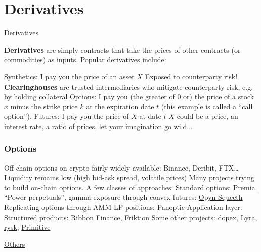 \documentclass[]{beamer}
\begin{document}
\section{Derivatives}


\begin{frame}{Derivatives}

\textbf{Derivatives} are simply contracts that take the prices of other contracts (or commodities) as inputs. Popular derivatives include: 

\bi 
\m Synthetics: I pay you the price of an asset $X$ 
\bi 
\m Exposed to counterparty risk! 
\m \textbf{Clearinghouses} are trusted intermediaries who mitigate counterparty risk, e.g. by holding collateral 
\ei 
\m Options: I pay you (the greater of 0 or) the price of a stock $x$ minus the strike price $k$ at the expiration date $t$ (this example is called a ``call option''). 
\m Futures: I pay you the price of $X$ at date $t$
\m $X$ could be a price, an interest rate, a ratio of prices, let your imagination go wild... 
\ei 
    
\end{frame}

\begin{frame}
\frametitle{Options}

\bi
\m Off-chain options on crypto fairly widely available: Binance, Deribit, FTX\ldots
\m Liquidity remains low (high bid-ask spread, volatile prices) 
\m Many projects trying to build on-chain options. A few classes of approaches:
\bi
\m Standard options: \href{https://premia.finance/}{Premia}
\m ``Power perpetuals'', gamma exposure through convex futures: \href{https://squeeth.opyn.co/?ct=US}{Opyn Squeeth}
\m Replicating options through AMM LP positions: \href{https://twitter.com/Panoptic_xyz}{Panoptic}
\ei
\m Application layer:
\bi
\m Structured products: \href{https://www.ribbon.finance/}{Ribbon Finance}, \href{https://friktion.fi/}{Friktion}
\ei
\m Some other projects: \href{https://twitter.com/dopex_io}{dopex}, \href{https://twitter.com/lyrafinance}{Lyra}, \href{https://twitter.com/ryskfinance}{rysk}, \href{https://primitive.xyz/}{Primitive}
\ei

\vspace{2ex}
\href{https://twitter.com/AnthonyLeeZhang/status/1579176369367703553}{Others}

\end{frame}
\end{document}
